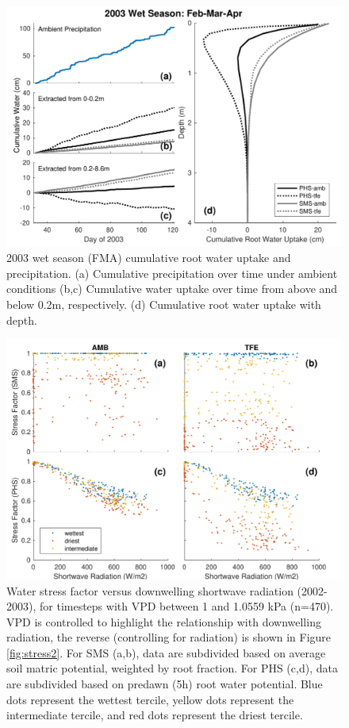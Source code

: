 \documentclass[draft,linenumbers]{agujournal}
\begin{document}
    \begin{figure}[h]
     \centering
     \includegraphics[width=30pc]{../figs3/qwet.pdf}
     \caption{2003 wet season (FMA) cumulative root water uptake and precipitation. 
     (a) Cumulative precipitation over time under ambient conditions
     (b,c) Cumulative water uptake over time from above and below 0.2m, respectively.
     (d) Cumulative root water uptake with depth.
     }
     \label{fig:qwet}
  \end{figure}


      \begin{figure}[h]
     \centering
     \includegraphics[width=30pc]{../figs3/suppstress.pdf}
     \caption{Water stress factor versus downwelling shortwave radiation (2002-2003), for timesteps with VPD between 1 and 1.0559 kPa (n=470).
     VPD is controlled to highlight the relationship with downwelling radiation, the reverse (controlling for radiation) is shown in Figure \ref{fig:stress2}.
     For SMS (a,b), data are subdivided based on average soil matric potential, weighted by root fraction.
     For PHS (c,d), data are subdivided based on predawn (5h) root water potential.
     Blue dots represent the wettest tercile, yellow dots represent the intermediate tercile, and red dots represent the driest tercile.
     }
     \label{supp:fsds}
       \end{figure}
         \clearpage
\end{document}
